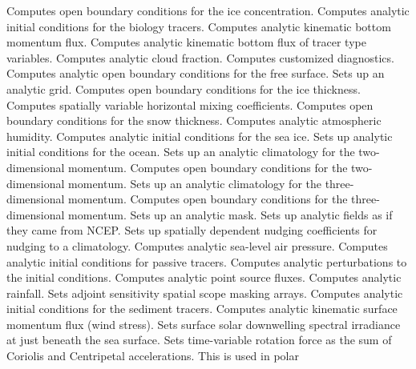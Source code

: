   \begin{klist}
      Computes open boundary conditions for the ice
   concentration.
      Computes analytic initial conditions for the
   biology tracers.
       Computes analytic kinematic bottom
   momentum flux.
       Computes analytic kinematic bottom flux of
   tracer type variables.
      Computes analytic cloud fraction.
      Computes customized diagnostics.
      Computes analytic open boundary conditions for
   the free surface.
       Sets up an analytic grid.
      Computes open boundary conditions for the ice
   thickness.
      Computes spatially variable horizontal mixing
   coefficients.
      Computes open boundary conditions for the snow
   thickness.
      Computes analytic atmospheric humidity.
      Computes analytic initial conditions for the sea ice.
       Sets up analytic initial conditions for the ocean.
      Sets up an analytic climatology for the
   two-dimensional momentum.
      Computes open boundary conditions for the
   two-dimensional momentum.
      Sets up an analytic climatology for the
   three-dimensional momentum.
      Computes open boundary conditions for the
   three-dimensional momentum.
       Sets up an analytic mask.
       Sets up analytic fields as if they came from NCEP.
       Sets up spatially dependent nudging
   coefficients for nudging to a climatology.
       Computes analytic sea-level air pressure.
       Computes analytic initial conditions for
   passive tracers.
       Computes analytic perturbations to the
   initial conditions.
       Computes analytic point source fluxes.
       Computes analytic rainfall.
       Sets adjoint sensitivity spatial scope masking
   arrays.
       Computes analytic initial conditions for the
   sediment tracers.
       Computes analytic kinematic surface
   momentum flux (wind stress).
       Sets surface solar downwelling spectral
     irradiance at just beneath the sea surface.
       Sets time-variable rotation force as the
   sum of Coriolis and Centripetal accelerations.  This is used in polar

\end{klist}
